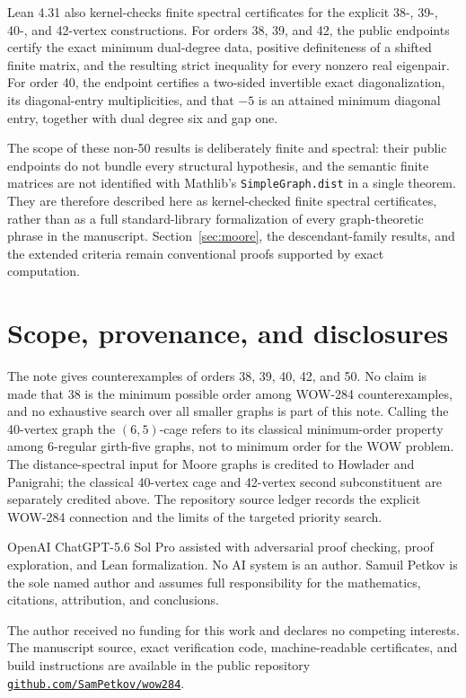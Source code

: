 \documentclass[a4paper,11pt,reqno]{amsart}
\theoremstyle{plain}
\theoremstyle{definition}
\theoremstyle{remark}
\begin{document}
Lean 4.31 also kernel-checks finite spectral certificates for the explicit
38-, 39-, 40-, and 42-vertex constructions.  For orders 38, 39, and 42, the
public endpoints certify the exact minimum dual-degree data, positive
definiteness of a shifted finite matrix, and the resulting strict inequality
for every nonzero real eigenpair.  For order 40, the endpoint certifies a
two-sided invertible exact diagonalization, its diagonal-entry
multiplicities, and that \(-5\) is an attained minimum diagonal entry, together
with dual degree six and gap one.

The scope of these non-50 results is deliberately finite and spectral: their
public endpoints do not bundle every structural hypothesis, and the semantic
finite matrices are not identified with Mathlib's
\texttt{SimpleGraph.dist} in a single theorem.  They are therefore described
here as kernel-checked finite spectral certificates, rather than as a full
standard-library formalization of every graph-theoretic phrase in the
manuscript.  Section~\ref{sec:moore}, the descendant-family results, and the
extended criteria remain conventional proofs supported by exact computation.

\section*{Scope, provenance, and disclosures}

The note gives counterexamples of orders 38, 39, 40, 42, and 50.  No claim is
made that 38 is the minimum possible order among WOW-284 counterexamples, and
no exhaustive search over all smaller graphs is part of this note.  Calling
the 40-vertex graph the \((6,5)\)-cage refers to its classical minimum-order
property among 6-regular girth-five graphs, not to minimum order for the WOW
problem.  The distance-spectral input for Moore graphs is credited to
Howlader and Panigrahi; the classical 40-vertex cage and 42-vertex second
subconstituent are separately credited above.  The repository source ledger
records the explicit WOW-284 connection and the limits of the targeted
priority search.

OpenAI ChatGPT-5.6 Sol Pro assisted with adversarial proof checking, proof
exploration, and Lean formalization.  No AI system is an author.  Samuil
Petkov is the sole named author and assumes full responsibility for the
mathematics, citations, attribution, and conclusions.

The author received no funding for this work and declares no competing
interests.  The manuscript source, exact verification code, machine-readable
certificates, and build instructions are available in the public repository
\href{https://github.com/SamPetkov/wow284}{\texttt{github.com/SamPetkov/wow284}}.
\end{document}
